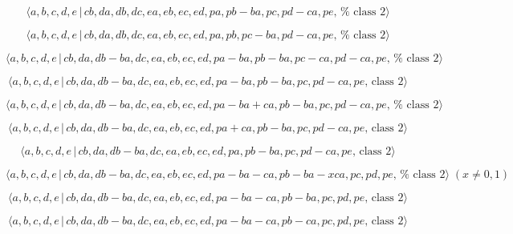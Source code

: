 \documentclass[10pt]{article}
\begin{document}
\begin{equation}
\langle a,b,c,d,e\,|\,cb,da,db,dc,ea,eb,ec,ed,pa,pb-ba,pc,pd-ca,pe,\,\text{%
class }2\rangle  \tag{7.4641}
\end{equation}

\begin{equation}
\langle a,b,c,d,e\,|\,cb,da,db,dc,ea,eb,ec,ed,pa,pb,pc-ba,pd-ca,pe,\,\text{%
class }2\rangle  \tag{7.4642}
\end{equation}

\begin{equation}
\langle
a,b,c,d,e\,|\,cb,da,db-ba,dc,ea,eb,ec,ed,pa-ba,pb-ba,pc-ca,pd-ca,pe,\,\text{%
class }2\rangle  \tag{7.4643}
\end{equation}

\begin{equation}
\langle a,b,c,d,e\,|\,cb,da,db-ba,dc,ea,eb,ec,ed,pa-ba,pb-ba,pc,pd-ca,pe,\,%
\text{class }2\rangle  \tag{7.4644}
\end{equation}

\begin{equation}
\langle
a,b,c,d,e\,|\,cb,da,db-ba,dc,ea,eb,ec,ed,pa-ba+ca,pb-ba,pc,pd-ca,pe,\,\text{%
class }2\rangle  \tag{7.4645}
\end{equation}

\begin{equation}
\langle a,b,c,d,e\,|\,cb,da,db-ba,dc,ea,eb,ec,ed,pa+ca,pb-ba,pc,pd-ca,pe,\,%
\text{class }2\rangle  \tag{7.4646}
\end{equation}

\begin{equation}
\langle a,b,c,d,e\,|\,cb,da,db-ba,dc,ea,eb,ec,ed,pa,pb-ba,pc,pd-ca,pe,\,%
\text{class }2\rangle  \tag{7.4647}
\end{equation}

\begin{equation}
\langle
a,b,c,d,e\,|\,cb,da,db-ba,dc,ea,eb,ec,ed,pa-ba-ca,pb-ba-xca,pc,pd,pe,\,\text{%
class }2\rangle \;(x \neq 0,1)  \tag{7.4648}
\end{equation}

\begin{equation}
\langle a,b,c,d,e\,|\,cb,da,db-ba,dc,ea,eb,ec,ed,pa-ba-ca,pb-ba,pc,pd,pe,\,%
\text{class }2\rangle  \tag{7.4649}
\end{equation}

\begin{equation}
\langle a,b,c,d,e\,|\,cb,da,db-ba,dc,ea,eb,ec,ed,pa-ba-ca,pb-ca,pc,pd,pe,\,%
\text{class }2\rangle  \tag{7.4650}
\end{equation}
\end{document}
